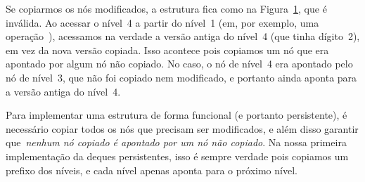 \documentclass[main.tex]{subfiles}
\begin{document}
\begin{figure}
\centering
{}
\caption{} \label{fig:func_ex1res}
\end{figure}

Se copiarmos os nós modificados, a estrutura fica como na Figura~\ref{fig:func_ex1res}, que é inválida. Ao acessar o nível~4 a partir do nível~1 (em, por exemplo, uma operação~), acessamos na verdade a versão antiga do nível~4 (que tinha dígito~2), em vez da nova versão copiada. Isso acontece pois copiamos um nó que era apontado por algum nó não copiado. No caso, o nó de nível~4 era apontado pelo nó de nível~3, que não foi copiado nem modificado, e portanto ainda aponta para a versão antiga do nível~4.

Para implementar uma estrutura de forma funcional (e portanto persistente), é necessário copiar todos os nós que precisam ser modificados, e além disso garantir que~\emph{nenhum nó copiado é apontado por um nó não copiado}. Na nossa primeira implementação da deques persistentes, isso é sempre verdade pois copiamos um prefixo dos níveis, e cada nível apenas aponta para o próximo nível.
\end{document}
